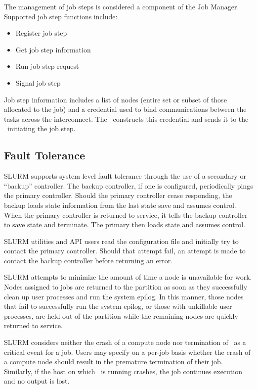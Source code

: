 \documentclass[10pt,onecolumn,times]{llncs}
\begin{document}
{The management of job steps is considered a component of the Job Manager.
Supported job step functions include:
\begin{itemize}
\item Register job step
\item Get job step information
\item Run job step request
\item Signal job step
\end{itemize}

Job step information includes a list of nodes (entire set or subset of
those allocated to the job) and a credential used to bind communications
between the tasks across the interconnect. The \slurmctld\ constructs
this credential and sends it to the \srun\ initiating the job step.

\subsection{Fault Tolerance}
SLURM supports system level fault tolerance through the use of a secondary
or ``backup'' controller.  The backup controller, if one is configured,
periodically pings the primary controller.  Should the primary controller
cease responding, the backup loads state information from the last state
save and assumes control.  When the primary controller is returned to
service, it tells the backup controller to save state and terminate.
The primary then loads state and assumes control.

SLURM utilities and API users read the configuration file and initially try
to contact the primary controller.  Should that attempt fail, an attempt
is made to contact the backup controller before returning an error.

SLURM attempts to minimize the amount of time a node is unavailable
for work.  Nodes assigned to jobs are returned to the partition as
soon as they successfully clean up user processes and run the system
epilog.  In this manner,
those nodes that fail to successfully run the system epilog, or those
with unkillable user processes, are held out of the partition while
the remaining nodes are quickly returned to service.

SLURM considers neither the crash of a compute node nor termination
of \srun\ as a critical event for a job. Users may specify on a per-job
basis whether the crash of a compute node should result in the premature
termination of their job. Similarly, if the host on which \srun\ is
running crashes, the job continues execution and no output is lost.


}
\end{document}
